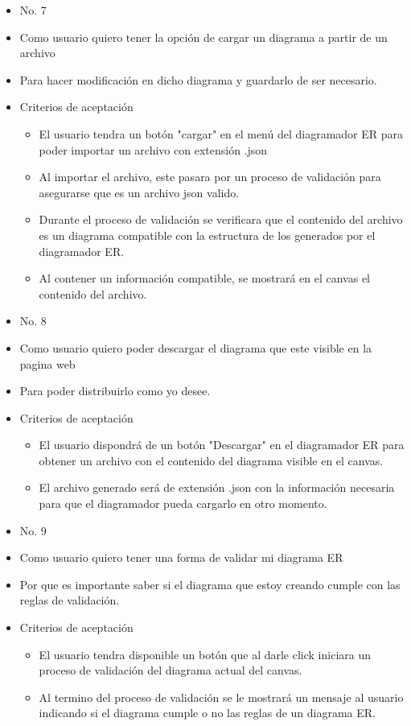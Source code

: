 \begin{itemize}
	\item No. 7
	\item Como usuario quiero tener la opción de cargar un diagrama a partir de un archivo
	\item Para hacer modificación en dicho diagrama y guardarlo de ser necesario.
	\item Criterios de aceptación
	\begin{itemize}
		\item El usuario tendra un botón "cargar" en el menú del diagramador ER para poder importar un archivo con extensión .json
		\item Al importar el archivo, este pasara por un proceso de validación para asegurarse que es un archivo json valido.
		\item Durante el proceso de validación se verificara que el contenido del archivo es un diagrama compatible con la estructura de los generados por el diagramador ER.
		\item Al contener un información compatible, se mostrará en el canvas el contenido del archivo.
	\end{itemize}
\end{itemize}
\hline
\begin{itemize}
	\item No. 8
	\item Como usuario quiero poder descargar el diagrama que este visible en la pagina web
	\item Para poder distribuirlo como yo desee.
	\item Criterios de aceptación
	\begin{itemize}
		\item El usuario dispondrá de un botón "Descargar" en el diagramador ER para obtener un archivo con el contenido del diagrama visible en el canvas.
		\item El archivo generado será de extensión .json con la información necesaria para que el diagramador pueda cargarlo en otro momento.
	\end{itemize}
\end{itemize}
\hline
\begin{itemize}
	\item No. 9
	\item Como usuario quiero tener una forma de validar mi diagrama ER
	\item Por que es importante saber si el diagrama que estoy creando cumple con las reglas de validación.
	\item Criterios de aceptación
	\begin{itemize}
		\item El usuario tendra disponible un botón que al darle click iniciara un proceso de validación del diagrama actual del canvas.
		\item Al termino del proceso de validación se le mostrará un mensaje al usuario indicando si el diagrama cumple o no las reglas de un diagrama ER.
	\end{itemize}
\end{itemize}
